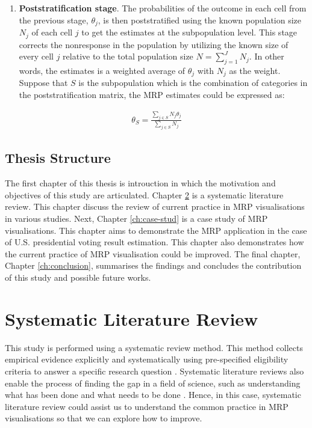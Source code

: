 \documentclass{monashthesis}
\begin{document}
\begin{enumerate}
\def\labelenumi{\arabic{enumi}.}
\setcounter{enumi}{1}
\tightlist
\item
  \textbf{Poststratification stage}. The probabilities of the outcome in each cell from the previous stage, \(\theta_j\), is then poststratified using the known population size \(N_j\) of each cell \(j\) to get the estimates at the subpopulation level. This stage corrects the nonresponse in the population by utilizing the known size of every cell \(j\) relative to the total population size \(N = \sum_{j=1}^J N_j\). In other words, the estimates is a weighted average of \(\theta_j\) with \(N_j\) as the weight. Suppose that \(S\) is the subpopulation which is the combination of categories in the poststratification matrix, the MRP estimates could be expressed as:
\end{enumerate}

\begin{equation} 
\begin{split}
\theta_S = \frac{\sum_{j \in S}N_j\theta_j}{\sum_{j\in S}N_j}
\end{split}
\label{eq:mrp-stage2}
\end{equation}

\hypertarget{thesis-structure}{%
\section{Thesis Structure}\label{thesis-structure}}

The first chapter of this thesis is introuction in which the motivation and objectives of this study are articulated. Chapter \ref{ch:syslitrev} is a systematic literature review. This chapter discuss the review of current practice in MRP visualisations in various studies. Next, Chapter \ref{ch:case-stud} is a case study of MRP visualisations. This chapter aims to demonstrate the MRP application in the case of U.S. presidential voting result estimation. This chapter also demonstrates how the current practice of MRP visualisation could be improved. The final chapter, Chapter \ref{ch:conclusion}, summarises the findings and concludes the contribution of this study and possible future works.

\hypertarget{ch:syslitrev}{%
\chapter{Systematic Literature Review}\label{ch:syslitrev}}

This study is performed using a systematic review method. This method collects empirical evidence explicitly and systematically using pre-specified eligibility criteria to answer a specific research question \autocite{cochrane}. Systematic literature reviews also enable the process of finding the gap in a field of science, such as understanding what has been done and what needs to be done \autocite{LinnenlueckeMartinaK2020Cslr}. Hence, in this case, systematic literature review could assist us to understand the common practice in MRP visualisations so that we can explore how to improve.
\end{document}
